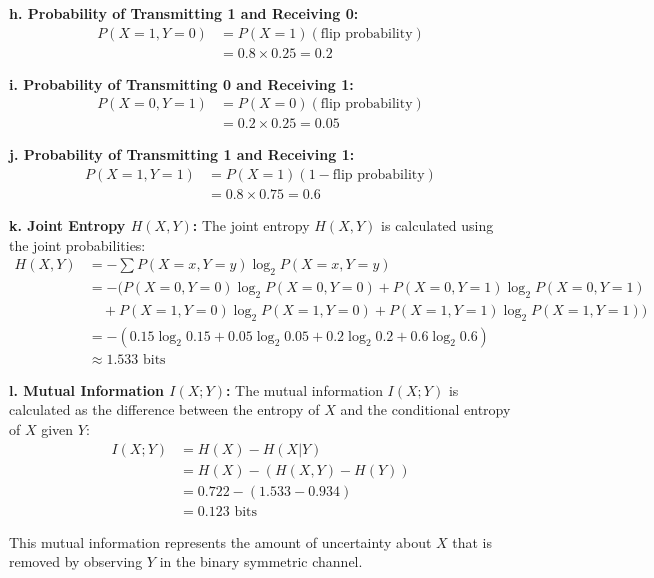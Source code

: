 \documentclass{article}
\begin{document}
\textbf{h. Probability of Transmitting 1 and Receiving 0:}
\begin{align*}
    P(X=1, Y=0) &= P(X=1)(\text{flip probability}) \\
    &= 0.8 \times 0.25 = 0.2
\end{align*}

\textbf{i. Probability of Transmitting 0 and Receiving 1:}
\begin{align*}
    P(X=0, Y=1) &= P(X=0)(\text{flip probability}) \\
    &= 0.2 \times 0.25 = 0.05
\end{align*}

\textbf{j. Probability of Transmitting 1 and Receiving 1:}
\begin{align*}
    P(X=1, Y=1) &= P(X=1)(1 - \text{flip probability}) \\
    &= 0.8 \times 0.75 = 0.6
\end{align*}

\textbf{k. Joint Entropy \( H(X, Y) \):}
The joint entropy \( H(X, Y) \) is calculated using the joint probabilities:
\begin{align*}
    H(X, Y) &= -\sum P(X=x, Y=y) \log_2 P(X=x, Y=y) \\
    &= -(P(X=0, Y=0) \log_2 P(X=0, Y=0) + P(X=0, Y=1) \log_2 P(X=0, Y=1) \\
    &\quad + P(X=1, Y=0) \log_2 P(X=1, Y=0) + P(X=1, Y=1) \log_2 P(X=1, Y=1)) \\
    &= -(0.15 \log_2 0.15 + 0.05 \log_2 0.05 + 0.2 \log_2 0.2 + 0.6 \log_2 0.6) \\
    &\approx 1.533 \text{ bits}
\end{align*}

\textbf{l. Mutual Information \( I(X; Y) \):}
The mutual information \( I(X; Y) \) is calculated as the difference between the entropy of \( X \) and the conditional entropy of \( X \) given \( Y \):
\begin{align*}
    I(X; Y) &= H(X) - H(X|Y) \\
    &= H(X) - (H(X, Y) - H(Y)) \\
    &= 0.722 - (1.533 - 0.934) \\
    &= 0.123 \text{ bits}
\end{align*}

This mutual information represents the amount of uncertainty about \( X \) that is removed by observing \( Y \) in the binary symmetric channel.
\end{document}
